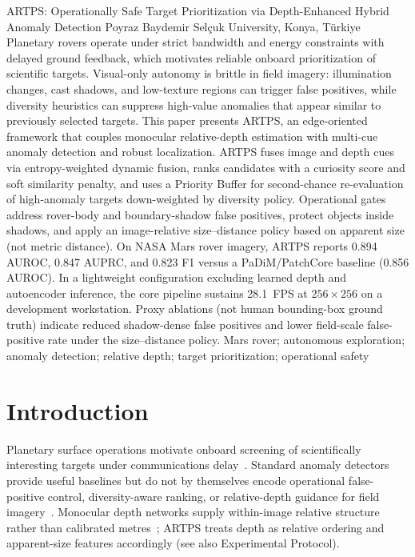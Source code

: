 \documentclass[10pt,twocolumn,letterpaper]{article}
\begin{document}
\IACmaketitle
{ARTPS: Operationally Safe Target Prioritization via Depth-Enhanced Hybrid Anomaly Detection}
{Poyraz Baydemir}
{Sel\c{c}uk University, Konya, T\"urkiye}
{%
Planetary rovers operate under strict bandwidth and energy constraints with delayed ground
feedback, which motivates reliable onboard prioritization of scientific targets. Visual-only
autonomy is brittle in field imagery: illumination changes, cast shadows, and low-texture
regions can trigger false positives, while diversity heuristics can suppress high-value
anomalies that appear similar to previously selected targets.
This paper presents ARTPS, an edge-oriented framework that couples monocular relative-depth
estimation with multi-cue anomaly detection and robust localization.
ARTPS fuses image and depth cues via entropy-weighted dynamic fusion, ranks candidates with
a curiosity score and soft similarity penalty, and uses a Priority Buffer for second-chance
re-evaluation of high-anomaly targets down-weighted by diversity policy.
Operational gates address rover-body and boundary-shadow false positives, protect objects
inside shadows, and apply an image-relative size--distance policy based on apparent size
(not metric distance).
On NASA Mars rover imagery, ARTPS reports 0.894 AUROC, 0.847 AUPRC, and 0.823 F1 versus a
PaDiM/PatchCore baseline (0.856 AUROC).
In a lightweight configuration excluding learned depth and autoencoder inference, the core
pipeline sustains 28.1~FPS at $256{\times}256$ on a development workstation.
Proxy ablations (not human bounding-box ground truth) indicate reduced shadow-dense false
positives and lower field-scale false-positive rate under the size--distance policy.
}%
{Mars rover; autonomous exploration; anomaly detection; relative depth; target prioritization; operational safety}

\section{Introduction}
Planetary surface operations motivate onboard screening of scientifically interesting targets
under communications delay~\citep{estlin2012}.
Standard anomaly detectors provide useful baselines but do not by themselves encode
operational false-positive control, diversity-aware ranking, or relative-depth guidance for
field imagery~\citep{defard2020padim,roth2022patchcore}.
Monocular depth networks supply within-image relative structure rather than calibrated
metres~\citep{ranftl2021dpt}; ARTPS treats depth as relative ordering and apparent-size
features accordingly (see also Experimental Protocol).
\end{document}
